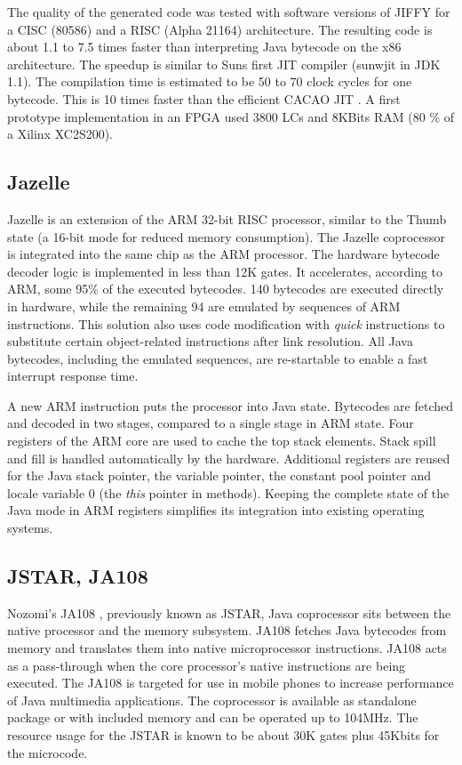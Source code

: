 The quality of the generated code was tested with software versions
of JIFFY for a CISC (80586) and a RISC (Alpha 21164) architecture.
The resulting code is about 1.1 to 7.5 times faster than
interpreting Java bytecode on the x86 architecture. The speedup is
similar to Suns first JIT compiler (sunwjit in JDK 1.1). The
compilation time is estimated to be 50 to 70 clock cycles for one
bytecode. This is 10 times faster than the efficient CACAO JIT
\cite{Krall98}. A first prototype implementation in an FPGA used
3800 LCs and 8KBits RAM (80 \% of a Xilinx XC2S200).


\subsection{Jazelle}

Jazelle \cite{Jazelle} is an extension of the ARM 32-bit RISC
processor, similar to the Thumb state (a 16-bit mode for reduced
memory consumption). The Jazelle coprocessor is integrated into the
same chip as the ARM processor. The hardware bytecode decoder logic
is implemented in less than 12K gates. It accelerates, according to
ARM, some 95\% of the executed bytecodes. 140 bytecodes are executed
directly in hardware, while the remaining 94 are emulated by
sequences of ARM instructions. This solution also uses code
modification with \textit{quick} instructions to substitute certain
object-related instructions after link resolution. All Java
bytecodes, including the emulated sequences, are re-startable to
enable a fast interrupt response time.


A new ARM instruction puts the processor into Java state. Bytecodes
are fetched and decoded in two stages, compared to a single stage in
ARM state. Four registers of the ARM core are used to cache the top
stack elements. Stack spill and fill is handled automatically by the
hardware. Additional registers are reused for the Java stack
pointer, the variable pointer, the constant pool pointer and locale
variable 0 (the \textit{this} pointer in methods). Keeping the
complete state of the Java mode in ARM registers simplifies its
integration into existing operating systems.

\subsection{JSTAR, JA108}

Nozomi's JA108 \cite{JSTAR}, previously known as JSTAR, Java
coprocessor sits between the native processor and the memory
subsystem. JA108 fetches Java bytecodes from memory and translates
them into native microprocessor instructions. JA108 acts as a
pass-through when the core processor's native instructions are being
executed. The JA108 is targeted for use in mobile phones to increase
performance of Java multimedia applications. The coprocessor is
available as standalone package or with included memory and can be
operated up to 104MHz. The resource usage for the JSTAR is known to
be about 30K gates plus 45Kbits for the microcode.

